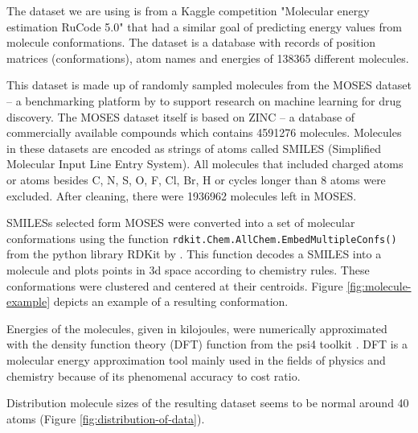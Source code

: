 The dataset we are using is from a Kaggle competition "Molecular energy estimation RuCode 5.0" that had a similar goal of predicting energy values from molecule conformations. The dataset is a database with records of position matrices (conformations), atom names and energies of 138365 different molecules.

This dataset is made up of randomly sampled molecules from the MOSES dataset -- a benchmarking platform by \citeauthor{MOSES} to support research on machine learning for drug discovery. The MOSES dataset itself is based on ZINC -- a database of commercially available compounds which contains 4591276 molecules. Molecules in these datasets are encoded as strings of atoms called SMILES (Simplified Molecular Input Line Entry System). All molecules that included charged atoms or atoms besides C, N, S, O, F, Cl, Br, H or cycles longer than 8 atoms were excluded. After cleaning, there were 1936962 molecules left in MOSES.

\begin{Figure}
    \centering
    
    \captionsetup{width=.9\linewidth}
    \label{fig:molecule-example}
\end{Figure}

SMILESs selected form MOSES were converted into a set of molecular conformations using the function \texttt{rdkit.Chem.AllChem.EmbedMultipleConfs()} from the python library RDKit by \citeauthor{RDKIT}. This function decodes a SMILES into a molecule and plots points in 3d space according to chemistry rules. These conformations were clustered and centered at their centroids. Figure \ref{fig:molecule-example} depicts an example of a resulting conformation.

Energies of the molecules, given in kilojoules, were numerically approximated with the density function theory (DFT) function from the psi4 toolkit \cite{psi4}. DFT is a molecular energy approximation tool mainly used in the fields of physics and chemistry because of its phenomenal accuracy to cost ratio. 

Distribution molecule sizes of the resulting dataset seems to be normal around 40 atoms (Figure \ref{fig:distribution-of-data}).

\begin{Figure}
    \centering
    
    \captionsetup{width=.9\linewidth}
    \label{fig:distribution-of-data}
\end{Figure}